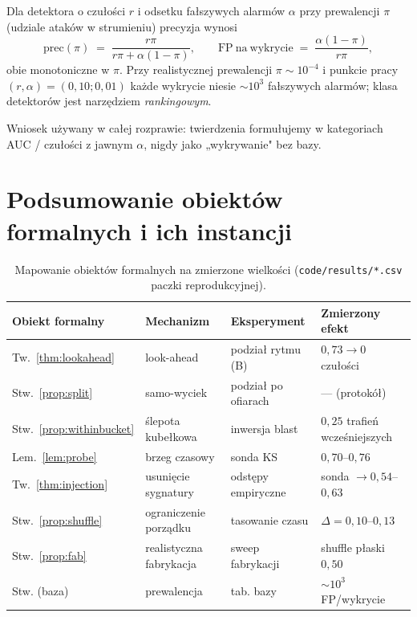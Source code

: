 \begin{proposition}
Dla detektora o czułości $r$ i odsetku fałszywych alarmów $\alpha$ przy
prewalencji $\pi$ (udziale ataków w strumieniu) precyzja wynosi
\[
\mathrm{prec}(\pi) \;=\;
\frac{r\pi}{r\pi+\alpha(1-\pi)},
\qquad
\mathrm{FP\ na\ wykrycie} \;=\; \frac{\alpha(1-\pi)}{r\pi},
\]
obie monotoniczne w $\pi$. Przy realistycznej prewalencji
$\pi\sim10^{-4}$ i punkcie pracy $(r,\alpha)=(0{,}10;0{,}01)$ każde
wykrycie niesie $\sim10^3$ fałszywych alarmów; klasa detektorów jest
narzędziem \emph{rankingowym}.
\end{proposition}

Wniosek używany w całej rozprawie: twierdzenia formułujemy w kategoriach
AUC / czułości z jawnym $\alpha$, nigdy jako „wykrywanie" bez bazy.

\chapter{Podsumowanie obiektów formalnych i ich instancji}
\label{sec:mapping}

\begin{table}[h]\centering\small
\begin{tabular}{llll}
\toprule
Obiekt formalny & Mechanizm & Eksperyment & Zmierzony efekt \\
\midrule
Tw.~\ref{thm:lookahead} & look-ahead & podział rytmu (B) & $0{,}73\to0$ czułości \\
Stw.~\ref{prop:split} & samo-wyciek & podział po ofiarach & --- (protokół) \\
Stw.~\ref{prop:withinbucket} & ślepota kubełkowa & inwersja blast & $0{,}25$ trafień wcześniejszych \\
Lem.~\ref{lem:probe} & brzeg czasowy & sonda KS & $0{,}70$--$0{,}76$ \\
Tw.~\ref{thm:injection} & usunięcie sygnatury & odstępy empiryczne & sonda $\to0{,}54$--$0{,}63$ \\
Stw.~\ref{prop:shuffle} & ograniczenie porządku & tasowanie czasu & $\Delta=0{,}10$--$0{,}13$ \\
Stw.~\ref{prop:fab} & realistyczna fabrykacja & sweep fabrykacji & shuffle płaski $0{,}50$ \\
Stw. (baza) & prewalencja & tab. bazy & $\sim10^3$ FP/wykrycie \\
\bottomrule
\end{tabular}
\caption{Mapowanie obiektów formalnych na zmierzone wielkości
(\texttt{code/results/*.csv} paczki reprodukcyjnej).}
\label{tab:mapping}
\end{table}

